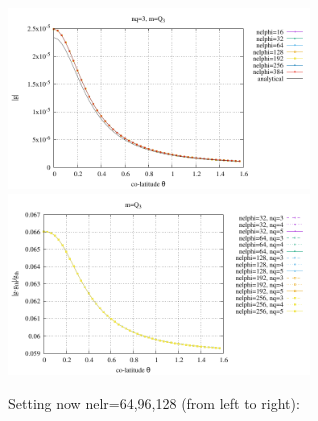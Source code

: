 \begin{center}
\includegraphics[width=8cm]{python_codes/fieldstone_152/RESULTS/exp2/gravity/nelr32/gravity.pdf}
\includegraphics[width=8cm]{python_codes/fieldstone_152/RESULTS/exp2/gravity/nelr32/gravity_error.pdf}
\end{center}

Setting now {\python nelr=64,96,128} (from left to right):

